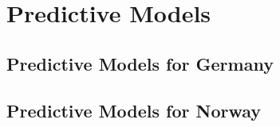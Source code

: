 \section{Predictive Models}
\subsection{Predictive Models for Germany}
\subsection{Predictive Models for Norway}